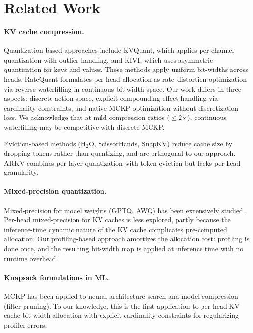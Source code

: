 \documentclass[11pt,a4paper]{article}
\begin{document}
\section{Related Work}
\label{sec:related}

\paragraph{KV cache compression.}
Quantization-based approaches include KVQuant, which applies per-channel quantization with outlier handling, and KIVI, which uses asymmetric quantization for keys and values.
These methods apply uniform bit-widths across heads.
RateQuant formulates per-head allocation as rate--distortion optimization via reverse waterfilling in continuous bit-width space.
Our work differs in three aspects: discrete action space, explicit compounding effect handling via cardinality constraints, and native MCKP optimization without discretization loss.
We acknowledge that at mild compression ratios ($\leq$2$\times$), continuous waterfilling may be competitive with discrete MCKP.

Eviction-based methods (H$_2$O, ScissorHands, SnapKV) reduce cache size by dropping tokens rather than quantizing, and are orthogonal to our approach.
ARKV combines per-layer quantization with token eviction but lacks per-head granularity.

\paragraph{Mixed-precision quantization.}
Mixed-precision for model weights (GPTQ, AWQ) has been extensively studied.
Per-head mixed-precision for KV caches is less explored, partly because the inference-time dynamic nature of the KV cache complicates pre-computed allocation.
Our profiling-based approach amortizes the allocation cost: profiling is done once, and the resulting bit-width map is applied at inference time with no runtime overhead.

\paragraph{Knapsack formulations in ML.}
MCKP has been applied to neural architecture search and model compression (filter pruning).
To our knowledge, this is the first application to per-head KV cache bit-width allocation with explicit cardinality constraints for regularizing profiler errors.
\end{document}
